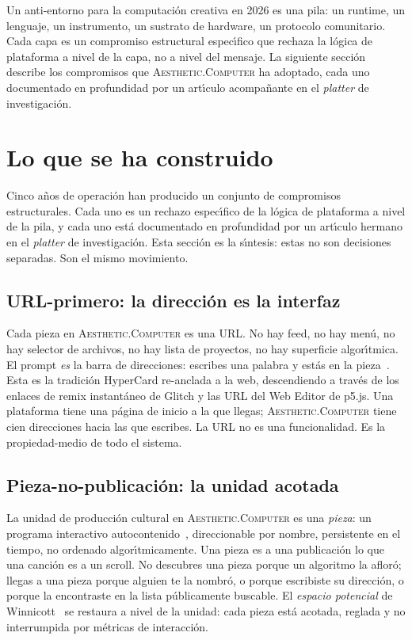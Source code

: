 \documentclass[10pt,letterpaper,twocolumn]{article}
\newcommand{\ac}{\textsc{Aesthetic.Computer}}
\begin{document}
Un anti-entorno para la computaci\'{o}n creativa en 2026 es una pila: un runtime, un lenguaje, un instrumento, un sustrato de hardware, un protocolo comunitario. Cada capa es un compromiso estructural espec\'{\i}fico que rechaza la l\'{o}gica de plataforma a nivel de la capa, no a nivel del mensaje. La siguiente secci\'{o}n describe los compromisos que \ac{} ha adoptado, cada uno documentado en profundidad por un art\'{\i}culo acompa\~{n}ante en el \emph{platter} de investigaci\'{o}n.

\section{Lo que se ha construido}

Cinco a\~{n}os de operaci\'{o}n han producido un conjunto de compromisos estructurales. Cada uno es un rechazo espec\'{\i}fico de la l\'{o}gica de plataforma a nivel de la pila, y cada uno est\'{a} documentado en profundidad por un art\'{\i}culo hermano en el \emph{platter} de investigaci\'{o}n. Esta secci\'{o}n es la s\'{\i}ntesis: estas no son decisiones separadas. Son el mismo movimiento.

\subsection{URL-primero: la direcci\'{o}n es la interfaz}

Cada pieza en \ac{} es una URL. No hay feed, no hay men\'{u}, no hay selector de archivos, no hay lista de proyectos, no hay superficie algor\'{\i}tmica. El prompt \emph{es} la barra de direcciones: escribes una palabra y est\'{a}s en la pieza~\citep{scudder2026urltradition}. Esta es la tradici\'{o}n HyperCard re-anclada a la web, descendiendo a trav\'{e}s de los enlaces de remix instant\'{a}neo de Glitch y las URL del Web Editor de p5.js. Una plataforma tiene una p\'{a}gina de inicio a la que llegas; \ac{} tiene cien direcciones hacia las que escribes. La URL no es una funcionalidad. Es la propiedad-medio de todo el sistema.

\subsection{Pieza-no-publicaci\'{o}n: la unidad acotada}

La unidad de producci\'{o}n cultural en \ac{} es una \emph{pieza}: un programa interactivo autocontenido~\citep{scudder2026pieces}, direccionable por nombre, persistente en el tiempo, no ordenado algor\'{\i}tmicamente. Una pieza es a una publicaci\'{o}n lo que una canci\'{o}n es a un scroll. No descubres una pieza porque un algoritmo la aflor\'{o}; llegas a una pieza porque alguien te la nombr\'{o}, o porque escribiste su direcci\'{o}n, o porque la encontraste en la lista p\'{u}blicamente buscable. El \emph{espacio potencial} de Winnicott~\citep{winnicott1971playing} se restaura a nivel de la unidad: cada pieza est\'{a} acotada, reglada y no interrumpida por m\'{e}tricas de interacci\'{o}n.
\end{document}
